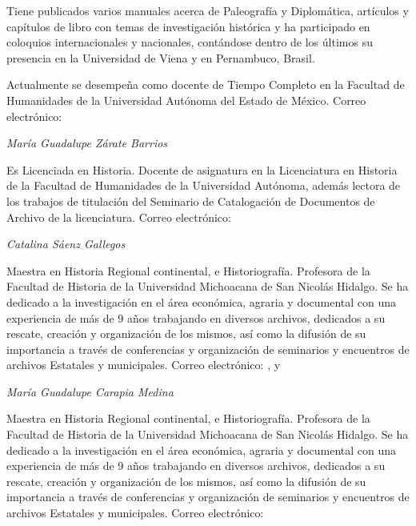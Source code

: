 { 
Tiene publicados varios manuales acerca de Paleografía y Diplomática,
artículos y capítulos de libro con temas de investigación histórica y ha
participado en coloquios internacionales y nacionales, contándose dentro de
los últimos su presencia en la Universidad de Viena y en Pernambuco,
Brasil.}

{ 
Actualmente se desempeña como docente de Tiempo Completo en la Facultad de
Humanidades de la Universidad Autónoma del Estado de México. Correo
electrónico:\textit{
}\href{mailto:bribiescas3603@yahoo.com.mx}{}\href{mailto:bribiescas3603@yahoo.com.mx}{}}


\bigskip

{ 
\textit{María Guadalupe Zárate Barrios}}

{ 
Es Licenciada en Historia. Docente de asignatura en la Licenciatura en
Historia de la Facultad de Humanidades de la Universidad Autónoma, además
lectora de los trabajos de titulación del Seminario de Catalogación de
Documentos de Archivo de la licenciatura. Correo electrónico:\textit{ }}


\bigskip

{ 
\textit{Catalina Sáenz Gallegos}}

{ 
Maestra en Historia Regional continental, e Historiografía.  Profesora de la
Facultad de Historia de la Universidad Michoacana de San Nicolás Hidalgo.
Se ha dedicado a la investigación en el área económica, agraria y
documental  con una experiencia de más de 9 años trabajando en diversos
archivos, dedicados a su rescate, creación y organización de los mismos,
así como la difusión de su importancia a través de conferencias y
organización de seminarios y encuentros de archivos Estatales y
municipales. Correo electrónico:
\href{mailto:sagacat33@hotmail.com}{},
y \href{mailto:catsa37@gmailcom}{}}


\bigskip


\bigskip

{ 
\textit{María Guadalupe Carapia Medina }}

{ 
Maestra en Historia Regional continental, e Historiografía. Profesora de la
Facultad de Historia de la Universidad Michoacana de San Nicolás Hidalgo.
Se ha dedicado a la investigación en el área económica, agraria y
documental  con una experiencia de más de 9 años trabajando en diversos
archivos, dedicados a su rescate, creación y organización de los mismos,
así como la difusión de su importancia a través de conferencias y
organización de seminarios y encuentros de archivos Estatales y
municipales. Correo electrónico: 
\href{mailto:guadap73@hotmail.com}{}}


